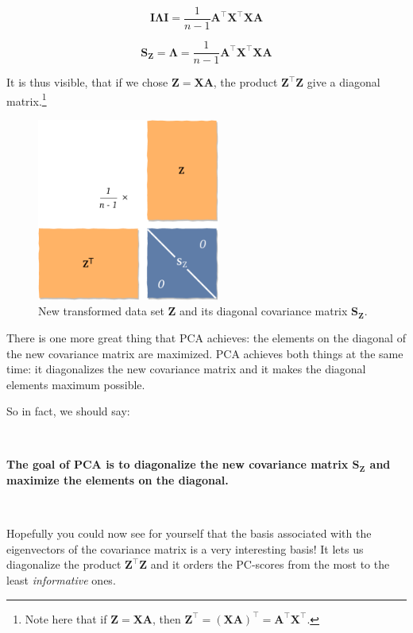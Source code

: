 \documentclass[10pt,twocolumn]{article}
\begin{document}
\begin{equation}
\mathbf{I} \mathbf{\Lambda} \mathbf{I} =  \frac{1}{n-1} \mathbf{A}^{\top}  \mathbf{X}^{\top} \mathbf{X} \mathbf{A}
\end{equation}

\begin{equation}
\mathbf{S_Z}  = \mathbf{\Lambda} = \frac{1}{n-1} \mathbf{A}^{\top}  \mathbf{X}^{\top} \mathbf{X} \mathbf{A}
\end{equation}

It is thus visible, that if we chose $\mathbf{Z} = \mathbf{X} \mathbf{A}$, the product $\mathbf{Z}^{\top} \mathbf{Z}$ give a diagonal matrix.\footnote{Note here that if $\mathbf{Z} = \mathbf{X} \mathbf{A}$, then $\mathbf{Z}^{\top} = (\mathbf{X} \mathbf{A})^{\top} = \mathbf{A}^{\top} \mathbf{X}^{\top}$.}

\begin{figure}[H]
\centering\includegraphics[width=6cm]{PC-scores.pdf}
\caption{New transformed data set $\mathbf{Z}$ and its diagonal covariance matrix $\mathbf{S_Z}$.}
\label{fig:PC-scores}
\end{figure}

There is one more great thing that PCA achieves: the elements on the diagonal of the new covariance matrix are maximized. PCA achieves both things at the same time: it diagonalizes the new covariance matrix and it makes the diagonal elements maximum possible.

So in fact, we should say:

\,\,

\textbf{The goal of PCA is to diagonalize the new covariance matrix $\mathbf{S_Z}$ and maximize the elements on the diagonal.}

\,\,

Hopefully you could now see for yourself that the basis associated with the eigenvectors of the covariance matrix is a very interesting basis! It lets us diagonalize the product $\mathbf{Z}^{\top} \mathbf{Z}$ and it orders the PC-scores from the most to the least \textit{informative} ones.
\end{document}
